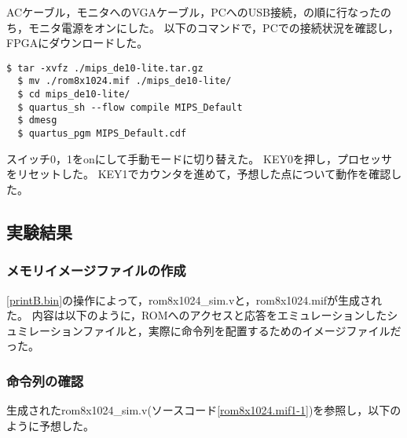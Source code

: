 ACケーブル，モニタへのVGAケーブル，PCへのUSB接続，の順に行なったのち，モニタ電源をオンにした。
以下のコマンドで，PCでの接続状況を確認し，FPGAにダウンロードした。
\begin{lstlisting}[caption={論理合成操作},label={論理合成操作1-1}]
  $ tar -xvfz ./mips_de10-lite.tar.gz
  $ mv ./rom8x1024.mif ./mips_de10-lite/
  $ cd mips_de10-lite/
  $ quartus_sh --flow compile MIPS_Default
  $ dmesg
  $ quartus_pgm MIPS_Default.cdf
\end{lstlisting}

スイッチ0，1をonにして手動モードに切り替えた。
KEY0を押し，プロセッサをリセットした。
KEY1でカウンタを進めて，予想した点について動作を確認した。

\subsection{実験結果}
\subsubsection{メモリイメージファイルの作成}
\ref{printB.bin}の操作によって，rom8x1024\_sim.vと，rom8x1024.mifが生成された。
内容は以下のように，ROMへのアクセスと応答をエミュレーションしたシュミレーションファイルと，実際に命令列を配置するためのイメージファイルだった。





\subsubsection{命令列の確認}
生成されたrom8x1024\_sim.v(ソースコード\ref{rom8x1024.mif1-1})を参照し，以下のように予想した。

